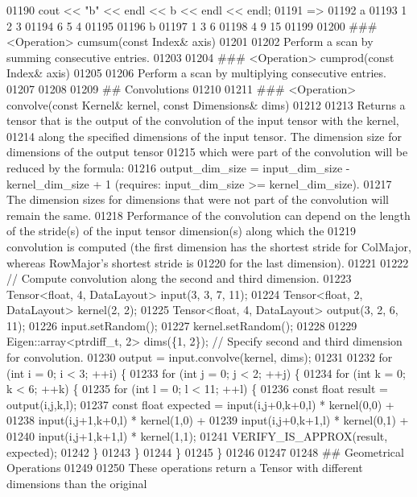 \begin{DoxyCode}
01190     cout << "b" << endl << b << endl << endl;
01191     =>
01192     a
01193     1 2 3
01194     6 5 4
01195 
01196     b
01197     1  3  6
01198     4  9 15
01199 
01200 ### <Operation> cumsum(const Index& axis)
01201 
01202 Perform a scan by summing consecutive entries.
01203 
01204 ### <Operation> cumprod(const Index& axis)
01205 
01206 Perform a scan by multiplying consecutive entries.
01207 
01208 
01209 ## Convolutions
01210 
01211 ### <Operation> convolve(const Kernel& kernel, const Dimensions& dims)
01212 
01213 Returns a tensor that is the output of the convolution of the input tensor with the kernel,
01214 along the specified dimensions of the input tensor. The dimension size for dimensions of the output
       tensor
01215 which were part of the convolution will be reduced by the formula:
01216 output\_dim\_size = input\_dim\_size - kernel\_dim\_size + 1 (requires: input\_dim\_size >= kernel\_dim\_size).
01217 The dimension sizes for dimensions that were not part of the convolution will remain the same.
01218 Performance of the convolution can depend on the length of the stride(s) of the input tensor
       dimension(s) along which the
01219 convolution is computed (the first dimension has the shortest stride for ColMajor, whereas RowMajor's
       shortest stride is
01220 for the last dimension).
01221 
01222     // Compute convolution along the second and third dimension.
01223     Tensor<float, 4, DataLayout> input(3, 3, 7, 11);
01224     Tensor<float, 2, DataLayout> kernel(2, 2);
01225     Tensor<float, 4, DataLayout> output(3, 2, 6, 11);
01226     input.setRandom();
01227     kernel.setRandom();
01228 
01229     Eigen::array<ptrdiff\_t, 2> dims(\{1, 2\});  // Specify second and third dimension for convolution.
01230     output = input.convolve(kernel, dims);
01231 
01232     for (int i = 0; i < 3; ++i) \{
01233       for (int j = 0; j < 2; ++j) \{
01234         for (int k = 0; k < 6; ++k) \{
01235           for (int l = 0; l < 11; ++l) \{
01236             const float result = output(i,j,k,l);
01237             const float expected = input(i,j+0,k+0,l) * kernel(0,0) +
01238                                    input(i,j+1,k+0,l) * kernel(1,0) +
01239                                    input(i,j+0,k+1,l) * kernel(0,1) +
01240                                    input(i,j+1,k+1,l) * kernel(1,1);
01241             VERIFY\_IS\_APPROX(result, expected);
01242           \}
01243         \}
01244       \}
01245     \}
01246 
01247 
01248 ## Geometrical Operations
01249 
01250 These operations return a Tensor with different dimensions than the original

\end{DoxyCode}
